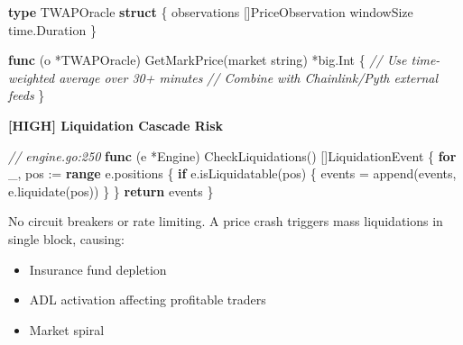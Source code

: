 \documentclass[
]{article}
\newenvironment{Shaded}{}{}
\newcommand{\BuiltInTok}[1]{\textcolor[rgb]{0.00,0.50,0.00}{#1}}
\newcommand{\CommentTok}[1]{\textcolor[rgb]{0.38,0.63,0.69}{\textit{#1}}}
\newcommand{\ControlFlowTok}[1]{\textcolor[rgb]{0.00,0.44,0.13}{\textbf{#1}}}
\newcommand{\DataTypeTok}[1]{\textcolor[rgb]{0.56,0.13,0.00}{#1}}
\newcommand{\KeywordTok}[1]{\textcolor[rgb]{0.00,0.44,0.13}{\textbf{#1}}}
\newcommand{\NormalTok}[1]{#1}
\newcommand{\OperatorTok}[1]{\textcolor[rgb]{0.40,0.40,0.40}{#1}}
\providecommand{\tightlist}{%
  \setlength{\itemsep}{0pt}\setlength{\parskip}{0pt}}
\begin{document}
\begin{Shaded}
\begin{Highlighting}[]
\KeywordTok{type}\NormalTok{ TWAPOracle }\KeywordTok{struct} \OperatorTok{\{}
\NormalTok{    observations }\OperatorTok{[]}\NormalTok{PriceObservation}
\NormalTok{    windowSize   time}\OperatorTok{.}\NormalTok{Duration}
\OperatorTok{\}}

\KeywordTok{func} \OperatorTok{(}\NormalTok{o }\OperatorTok{*}\NormalTok{TWAPOracle}\OperatorTok{)}\NormalTok{ GetMarkPrice}\OperatorTok{(}\NormalTok{market }\DataTypeTok{string}\OperatorTok{)} \OperatorTok{*}\NormalTok{big}\OperatorTok{.}\NormalTok{Int }\OperatorTok{\{}
    \CommentTok{// Use time{-}weighted average over 30+ minutes}
    \CommentTok{// Combine with Chainlink/Pyth external feeds}
\OperatorTok{\}}
\end{Highlighting}
\end{Shaded}

\textbf{{[}HIGH{]} Liquidation Cascade Risk}

\begin{Shaded}
\begin{Highlighting}[]
\CommentTok{// engine.go:250}
\KeywordTok{func} \OperatorTok{(}\NormalTok{e }\OperatorTok{*}\NormalTok{Engine}\OperatorTok{)}\NormalTok{ CheckLiquidations}\OperatorTok{()} \OperatorTok{[]}\NormalTok{LiquidationEvent }\OperatorTok{\{}
    \ControlFlowTok{for}\NormalTok{ \_}\OperatorTok{,}\NormalTok{ pos }\OperatorTok{:=} \KeywordTok{range}\NormalTok{ e}\OperatorTok{.}\NormalTok{positions }\OperatorTok{\{}
        \ControlFlowTok{if}\NormalTok{ e}\OperatorTok{.}\NormalTok{isLiquidatable}\OperatorTok{(}\NormalTok{pos}\OperatorTok{)} \OperatorTok{\{}
\NormalTok{            events }\OperatorTok{=} \BuiltInTok{append}\OperatorTok{(}\NormalTok{events}\OperatorTok{,}\NormalTok{ e}\OperatorTok{.}\NormalTok{liquidate}\OperatorTok{(}\NormalTok{pos}\OperatorTok{))}
        \OperatorTok{\}}
    \OperatorTok{\}}
    \ControlFlowTok{return}\NormalTok{ events}
\OperatorTok{\}}
\end{Highlighting}
\end{Shaded}

No circuit breakers or rate limiting. A price crash triggers mass
liquidations in single block, causing:

\begin{itemize}
\tightlist
\item
  Insurance fund depletion
\item
  ADL activation affecting profitable traders
\item
  Market spiral
\end{itemize}
\end{document}
